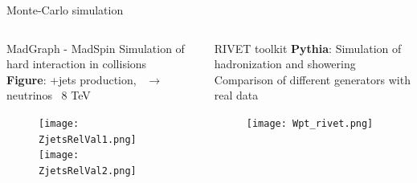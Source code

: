 \begin{frame}{Monte-Carlo simulation}
\vspace{-.4cm}
\begin{columns}
\begin{column}{.50\textwidth}
  \begin{block}{MadGraph - MadSpin}\tiny
    Simulation of hard interaction in collisions \\
    \textbf{Figure}: \Z+jets production, \Z~$\to$ neutrinos \MVAt~8 TeV
  \end{block}
\vspace{-.5cm}
\begin{figure}[!Hhtbp]
  \begin{center}
    \texttt{[image: ZjetsRelVal1.png]}\\
    \texttt{[image: ZjetsRelVal2.png]}
  \end{center}
\end{figure}
\end{column}

\begin{column}{.50\textwidth}
  \begin{block}{RIVET toolkit}\tiny
    \textbf{Pythia}: Simulation of hadronization and showering \\
    Comparison of different generators with real data %
  \end{block}
  \begin{figure}[!Hhtbp]
  \begin{center}
    \texttt{[image: Wpt\_rivet.png]}
  \end{center}
\end{figure}
\end{column}
\end{columns}

\end{frame}



